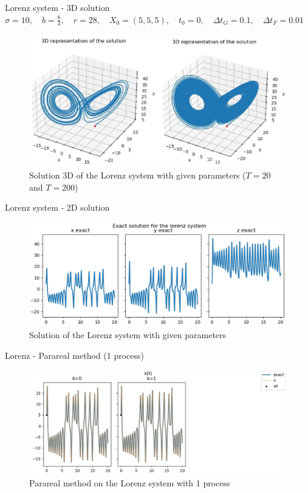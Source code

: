 \begin{frame}{Lorenz system - 3D solution}
	$\sigma=10, \quad b=\frac{8}{3}, \quad r=28, \quad X_0=(5,5,5), \quad t_0=0, \quad \Delta t_G=0.1, \quad \Delta t_F=0.01$
	\begin{figure}
		\centering
		\includegraphics[width=0.7\linewidth]{"images/parareal/lorenz_sol3D.jpg"}
		\caption{Solution 3D of the Lorenz system with given parameters ($T=20$ and $T=200$)}
	\end{figure}

	\end{frame}
	\begin{frame}{Lorenz system - 2D solution}

	\begin{minipage}{\linewidth}
	\begin{figure} 
		\centering     
		\includegraphics[width=\linewidth]{"images/parareal/lorenz_exact.jpg"}
		\caption{Solution of the Lorenz system with given parameters}
	\end{figure}
	\end{minipage}

	\end{frame}
	\begin{frame}{Lorenz - Parareal method (1 process)}
	
	\begin{minipage}{\linewidth}
	\begin{figure}
		\centering       
		\includegraphics[width=0.9\linewidth]{"images/parareal/lorenz_1p.jpg"}
		\caption{Parareal method on the Lorenz system with 1 process}
	\end{figure}
	\end{minipage}

	\end{frame}
